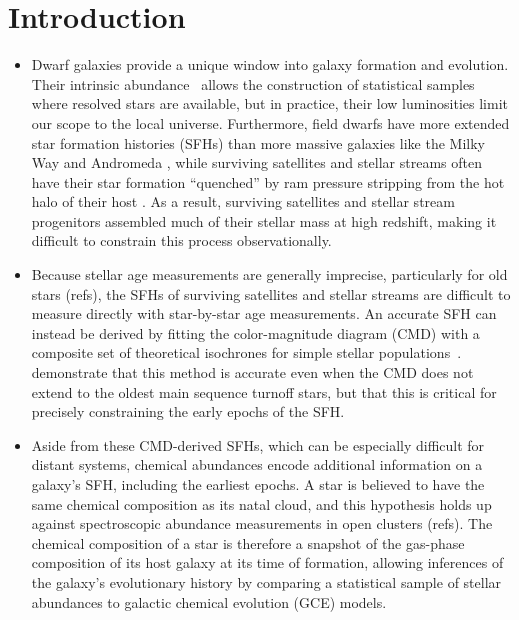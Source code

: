 \documentclass[ms.tex]{subfiles}
\begin{document}
\section{Introduction}
\label{sec:intro}

\begin{itemize}

	\item Dwarf galaxies provide a unique window into galaxy formation and
	evolution.
	Their intrinsic abundance~\citep{Bell2003, Baldry2012} allows the
	construction of statistical samples where resolved stars are available, but
	in practice, their low luminosities limit our scope to the local universe.
	Furthermore, field dwarfs have more extended star formation histories (SFHs)
	than more massive galaxies like the Milky Way and Andromeda
	\citep[e.g.][]{Behroozi2019}, while surviving satellites and stellar
	streams often have their star formation ``quenched'' by ram pressure
	stripping from the hot halo of their host
	\citep*[see discussion in, e.g.,][]{Steyrleithner2020}.
	As a result, surviving satellites and stellar stream progenitors assembled
	much of their stellar mass at high redshift, making it difficult to
	constrain this process observationally.

	\item Because stellar age measurements are generally imprecise,
	particularly for old stars (refs), the SFHs of surviving satellites and
	stellar streams are difficult to measure directly with star-by-star age
	measurements.
	An accurate SFH can instead be derived by fitting the color-magnitude
	diagram (CMD) with a composite set of theoretical isochrones for simple
	stellar populations~\citep[e.g.][]{Dolphin2002}.
	\citet{Weisz2014} demonstrate that this method is accurate even when the
	CMD does not extend to the oldest main sequence turnoff stars, but that
	this is critical for precisely constraining the early epochs of the SFH.

	\item Aside from these CMD-derived SFHs, which can be especially difficult
	for distant systems, chemical abundances encode additional information on a
	galaxy's SFH, including the earliest epochs.
	A star is believed to have the same chemical composition as its natal
	cloud, and this hypothesis holds up against spectroscopic abundance
	measurements in open clusters (refs).
	The chemical composition of a star is therefore a snapshot of the
	gas-phase composition of its host galaxy at its time of formation, allowing
	inferences of the galaxy's evolutionary history by comparing a statistical
	sample of stellar abundances to galactic chemical evolution (GCE) models.


\end{itemize}
\end{document}
